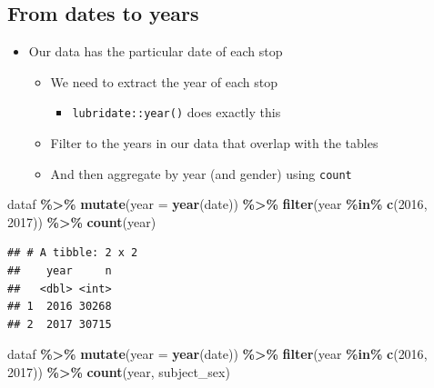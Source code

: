 \documentclass[
]{article}
\newenvironment{Shaded}{\begin{snugshade}}{\end{snugshade}}
\newcommand{\DataTypeTok}[1]{\textcolor[rgb]{0.13,0.29,0.53}{#1}}
\newcommand{\DecValTok}[1]{\textcolor[rgb]{0.00,0.00,0.81}{#1}}
\newcommand{\KeywordTok}[1]{\textcolor[rgb]{0.13,0.29,0.53}{\textbf{#1}}}
\newcommand{\NormalTok}[1]{#1}
\newcommand{\OperatorTok}[1]{\textcolor[rgb]{0.81,0.36,0.00}{\textbf{#1}}}
\newcommand{\StringTok}[1]{\textcolor[rgb]{0.31,0.60,0.02}{#1}}
\providecommand{\tightlist}{%
  \setlength{\itemsep}{0pt}\setlength{\parskip}{0pt}}
\begin{document}
\hypertarget{from-dates-to-years}{%
\subsection{From dates to years}\label{from-dates-to-years}}

\begin{itemize}
\tightlist
\item
  Our data has the particular date of each stop

  \begin{itemize}
  \tightlist
  \item
    We need to extract the year of each stop

    \begin{itemize}
    \tightlist
    \item
      \texttt{lubridate::year()} does exactly this
    \end{itemize}
  \item
    Filter to the years in our data that overlap with the tables
  \item
    And then aggregate by year (and gender) using \texttt{count}
  \end{itemize}
\end{itemize}

\begin{Shaded}
\begin{Highlighting}[]
\NormalTok{dataf }\OperatorTok{\%\textgreater{}\%}\StringTok{ }
\StringTok{    }\KeywordTok{mutate}\NormalTok{(}\DataTypeTok{year =} \KeywordTok{year}\NormalTok{(date)) }\OperatorTok{\%\textgreater{}\%}\StringTok{ }
\StringTok{    }\KeywordTok{filter}\NormalTok{(year }\OperatorTok{\%in\%}\StringTok{ }\KeywordTok{c}\NormalTok{(}\DecValTok{2016}\NormalTok{, }\DecValTok{2017}\NormalTok{)) }\OperatorTok{\%\textgreater{}\%}\StringTok{ }
\StringTok{    }\KeywordTok{count}\NormalTok{(year)}
\end{Highlighting}
\end{Shaded}

\begin{verbatim}
## # A tibble: 2 x 2
##    year     n
##   <dbl> <int>
## 1  2016 30268
## 2  2017 30715
\end{verbatim}

\begin{Shaded}
\begin{Highlighting}[]
\NormalTok{dataf }\OperatorTok{\%\textgreater{}\%}\StringTok{ }
\StringTok{    }\KeywordTok{mutate}\NormalTok{(}\DataTypeTok{year =} \KeywordTok{year}\NormalTok{(date)) }\OperatorTok{\%\textgreater{}\%}\StringTok{ }
\StringTok{    }\KeywordTok{filter}\NormalTok{(year }\OperatorTok{\%in\%}\StringTok{ }\KeywordTok{c}\NormalTok{(}\DecValTok{2016}\NormalTok{, }\DecValTok{2017}\NormalTok{)) }\OperatorTok{\%\textgreater{}\%}\StringTok{ }
\StringTok{    }\KeywordTok{count}\NormalTok{(year, subject\_sex)}
\end{Highlighting}
\end{Shaded}
\end{document}
